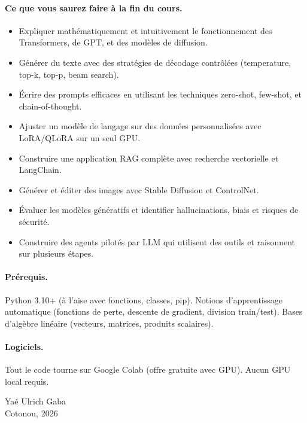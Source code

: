 \documentclass[12pt,a4paper,twoside]{book}
\begin{document}
\paragraph{Ce que vous saurez faire \`a la fin du cours.}
\begin{itemize}
  \item Expliquer math\'ematiquement et intuitivement le fonctionnement des Transformers, de GPT, et des mod\`eles de diffusion.
  \item G\'en\'erer du texte avec des strat\'egies de d\'ecodage contr\^ol\'ees (temperature, top-k, top-p, beam search).
  \item \'Ecrire des prompts efficaces en utilisant les techniques zero-shot, few-shot, et chain-of-thought.
  \item Ajuster un mod\`ele de langage sur des donn\'ees personnalis\'ees avec LoRA/QLoRA sur un seul GPU.
  \item Construire une application RAG compl\`ete avec recherche vectorielle et LangChain.
  \item G\'en\'erer et \'editer des images avec Stable Diffusion et ControlNet.
  \item \'Evaluer les mod\`eles g\'en\'eratifs et identifier hallucinations, biais et risques de s\'ecurit\'e.
  \item Construire des agents pilot\'es par LLM qui utilisent des outils et raisonnent sur plusieurs \'etapes.
\end{itemize}

\paragraph{Pr\'erequis.} Python 3.10+ (\`a l'aise avec fonctions, classes, pip). Notions d'apprentissage automatique (fonctions de perte, descente de gradient, division train/test). Bases d'alg\`ebre lin\'eaire (vecteurs, matrices, produits scalaires).

\paragraph{Logiciels.} Tout le code tourne sur Google Colab (offre gratuite avec GPU). Aucun GPU local requis.

\vfill
\noindent Yaé Ulrich Gaba\\
Cotonou, 2026

\mainmatter











\end{document}
